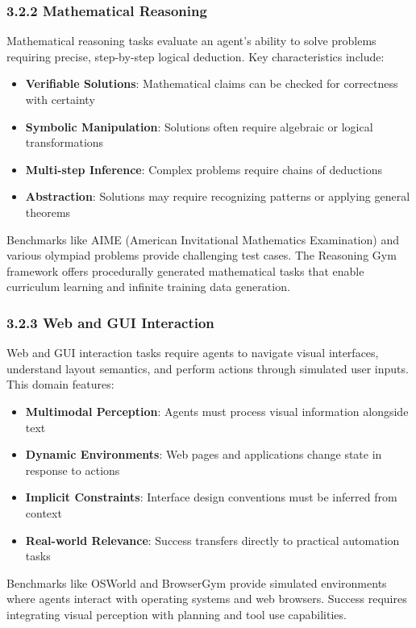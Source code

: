 \subsubsection{3.2.2 Mathematical Reasoning}

Mathematical reasoning tasks evaluate an agent's ability to solve problems requiring precise, step-by-step logical deduction. Key characteristics include:

\begin{itemize}
    \item \textbf{Verifiable Solutions}: Mathematical claims can be checked for correctness with certainty
    \item \textbf{Symbolic Manipulation}: Solutions often require algebraic or logical transformations
    \item \textbf{Multi-step Inference}: Complex problems require chains of deductions
    \item \textbf{Abstraction}: Solutions may require recognizing patterns or applying general theorems

\end{itemize}
Benchmarks like AIME (American Invitational Mathematics Examination) and various olympiad problems provide challenging test cases. The Reasoning Gym framework offers procedurally generated mathematical tasks that enable curriculum learning and infinite training data generation.

\subsubsection{3.2.3 Web and GUI Interaction}

Web and GUI interaction tasks require agents to navigate visual interfaces, understand layout semantics, and perform actions through simulated user inputs. This domain features:

\begin{itemize}
    \item \textbf{Multimodal Perception}: Agents must process visual information alongside text
    \item \textbf{Dynamic Environments}: Web pages and applications change state in response to actions
    \item \textbf{Implicit Constraints}: Interface design conventions must be inferred from context
    \item \textbf{Real-world Relevance}: Success transfers directly to practical automation tasks

\end{itemize}
Benchmarks like OSWorld and BrowserGym provide simulated environments where agents interact with operating systems and web browsers. Success requires integrating visual perception with planning and tool use capabilities.

